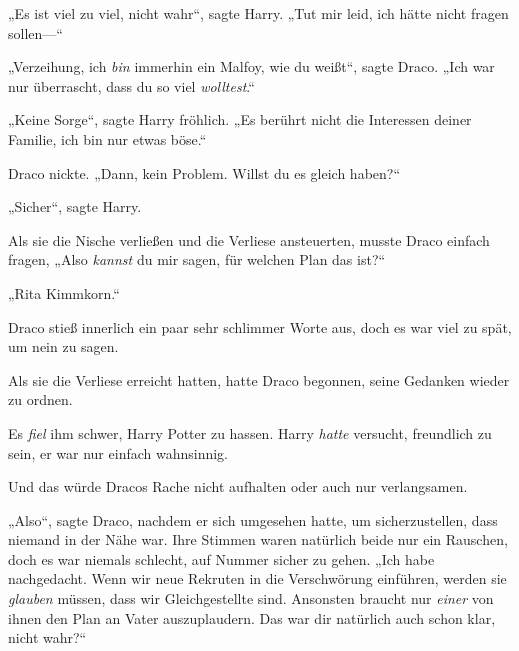 „Es ist viel zu viel, nicht wahr“, sagte Harry. „Tut mir leid, ich hätte nicht fragen sollen—“

„Verzeihung, ich \emph{bin} immerhin ein Malfoy, wie du weißt“, sagte Draco. „Ich war nur überrascht, dass du so viel \emph{wolltest}.“

„Keine Sorge“, sagte Harry fröhlich. „Es berührt nicht die Interessen deiner Familie, ich bin nur etwas böse.“

Draco nickte. „Dann, kein Problem. Willst du es gleich haben?“

„Sicher“, sagte Harry.

Als sie die Nische verließen und die Verliese ansteuerten, musste Draco einfach fragen, „Also \emph{kannst} du mir sagen, für welchen Plan das ist?“

„Rita Kimmkorn.“

Draco stieß innerlich ein paar sehr schlimmer Worte aus, doch es war viel zu spät, um nein zu sagen.

\later

Als sie die Verliese erreicht hatten, hatte Draco begonnen, seine Gedanken wieder zu ordnen.

Es \emph{fiel} ihm schwer, Harry Potter zu hassen. Harry \emph{hatte} versucht, freundlich zu sein, er war nur einfach wahnsinnig.

Und das würde Dracos Rache nicht aufhalten oder auch nur verlangsamen.

„Also“, sagte Draco, nachdem er sich umgesehen hatte, um sicherzustellen, dass niemand in der Nähe war. Ihre Stimmen waren natürlich beide nur ein Rauschen, doch es war niemals schlecht, auf Nummer sicher zu gehen. „Ich habe nachgedacht. Wenn wir neue Rekruten in die Verschwörung einführen, werden sie \emph{glauben} müssen, dass wir Gleichgestellte sind. Ansonsten braucht nur \emph{einer} von ihnen den Plan an Vater auszuplaudern. Das war dir natürlich auch schon klar, nicht wahr?“

